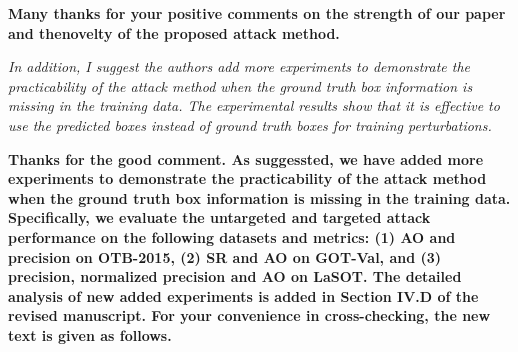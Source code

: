 \documentclass[12pt]{article}
\begin{document}
\textbf{Many thanks for your positive comments on the strength of our paper and thenovelty of the proposed attack method.}

\textit{In addition, I suggest the authors add more experiments to demonstrate the practicability of the attack method when the ground truth box information is missing in the training data. The experimental results show that it is effective to use the predicted boxes instead of ground truth boxes for training perturbations.}

\textbf{Thanks for the good comment. As suggessted, we have added more experiments to demonstrate the practicability of the attack method when the ground truth box information is missing in the training data. Specifically, we evaluate the untargeted and targeted attack performance on the following datasets and metrics: (1) AO and precision on OTB-2015, (2) SR and AO on GOT-Val, and (3) precision, normalized precision and AO on LaSOT.
The detailed analysis of new added experiments is added in Section IV.D of the revised manuscript. For your convenience in cross-checking, the new text is given as follows.}
\end{document}
